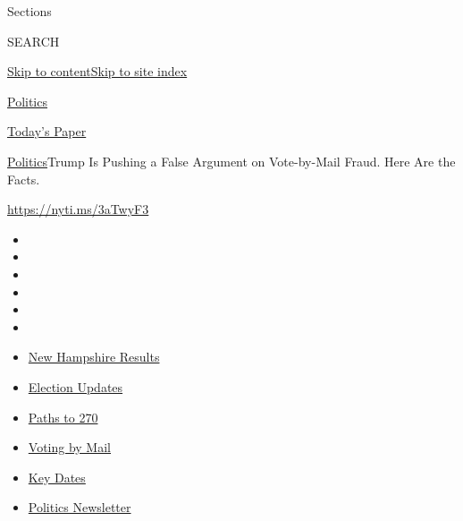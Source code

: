 Sections

SEARCH

\protect\hyperlink{site-content}{Skip to
content}\protect\hyperlink{site-index}{Skip to site index}

\href{https://www.nytimes3xbfgragh.onion/section/politics}{Politics}

\href{https://myaccount.nytimes3xbfgragh.onion/auth/login?response_type=cookie\&client_id=vi}{}

\href{https://www.nytimes3xbfgragh.onion/section/todayspaper}{Today's
Paper}

\href{/section/politics}{Politics}\textbar{}Trump Is Pushing a False
Argument on Vote-by-Mail Fraud. Here Are the Facts.

\url{https://nyti.ms/3aTwyF3}

\begin{itemize}
\item
\item
\item
\item
\item
\item
\end{itemize}

\begin{itemize}
\item
  \href{https://www.nytimes3xbfgragh.onion/interactive/2020/09/08/us/elections/results-new-hampshire-primary-elections.html?action=click\&pgtype=Article\&state=default\&region=TOP_BANNER\&context=storylines_menu}{New
  Hampshire Results}
\item
  \href{https://www.nytimes3xbfgragh.onion/live/2020/09/08/us/trump-vs-biden?action=click\&pgtype=Article\&state=default\&region=TOP_BANNER\&context=storylines_menu}{Election
  Updates}
\item
  \href{https://www.nytimes3xbfgragh.onion/interactive/2020/us/elections/election-states-biden-trump.html?action=click\&pgtype=Article\&state=default\&region=TOP_BANNER\&context=storylines_menu}{Paths
  to 270}
\item
  \href{https://www.nytimes3xbfgragh.onion/interactive/2020/08/31/us/politics/vote-by-mail-deadlines.html?action=click\&pgtype=Article\&state=default\&region=TOP_BANNER\&context=storylines_menu}{Voting
  by Mail}
\item
  \href{https://www.nytimes3xbfgragh.onion/interactive/2019/us/elections/2020-presidential-election-calendar.html?action=click\&pgtype=Article\&state=default\&region=TOP_BANNER\&context=storylines_menu}{Key
  Dates}
\item
  \href{https://www.nytimes3xbfgragh.onion/newsletters/politics?action=click\&pgtype=Article\&state=default\&region=TOP_BANNER\&context=storylines_menu}{Politics
  Newsletter}
\end{itemize}

